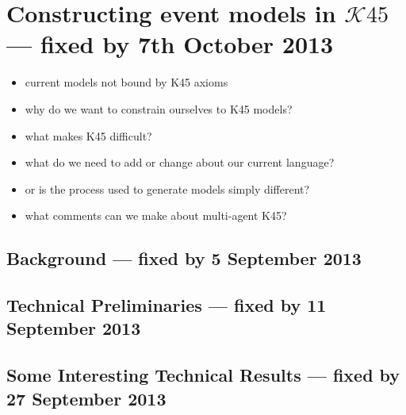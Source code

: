 \section{Constructing event models in $\mathcal{K}45$ --- fixed by 7th October 2013}

\begin{itemize}
	\item current models not bound by K45 axioms
	\item why do we want to constrain ourselves to K45 models?
	\item what makes K45 difficult?
	\item what do we need to add or change about our current language?
	\item or is the process used to generate models simply different?
	\item what comments can we make about multi-agent K45?
\end{itemize}

\subsection{Background --- fixed by 5 September 2013}

\subsection{Technical Preliminaries --- fixed by 11 September 2013}

\subsection{Some Interesting Technical Results --- fixed by 27 September 2013}
